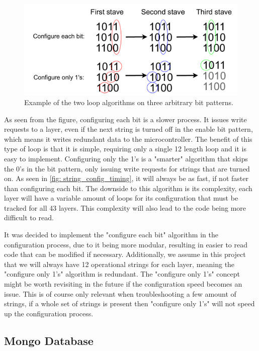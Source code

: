 \documentclass[main.tex]{subfiles}
\begin{document}
\begin{figure}[!ht]
    \centering
    \includegraphics[width=13cm, scale=1.5]{images/string_config_timing.pdf}
    \caption{Example of the two loop algorithms on three arbitrary bit patterns.}
    \label{fig: string_config_timing}
\end{figure}

As seen from the figure, configuring each bit is a slower process. It issues write requests to a layer, even if the next string is turned off in the enable bit pattern, which means it writes redundant data to the microcontroller. The benefit of this type of loop is that it is simple, requiring only a single 12 length loop and it is easy to implement.  Configuring only the 1's is a "smarter" algorithm that skips the 0's in the bit pattern, only issuing write requests for strings that are turned on. As seen in \autoref{fig: string_config_timing}, it will always be as fast, if not faster than configuring each bit. The downside to this algorithm is its complexity, each layer will have a variable amount of loops for its configuration that must be tracked for all 43 layers. This complexity will also lead to the code being more difficult to read.

It was decided to implement the "configure each bit" algorithm in the configuration process, due to it being more modular, resulting in easier to read code that can be modified if necessary. Additionally, we assume in this project that we will always have 12 operational strings for each layer, meaning the "configure only 1's" algorithm is redundant. The "configure only 1's" concept might be worth revisiting in the future if the configuration speed becomes an issue. This is of course only relevant when troubleshooting a few amount of strings, if a whole set of strings is present then "configure only 1's" will not speed up the configuration process.

\subsection{Mongo Database}
\end{document}

